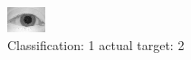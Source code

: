 \begin{figure}[h!]
\begin{center}
\includegraphics[width=0.60\columnwidth]{figures/ID980_class_1_target_2.png}
\end{center}
\caption{ Classification: 1 actual target: 2}
\label{fig:ID980_class_1_target_2}
\end{figure}
